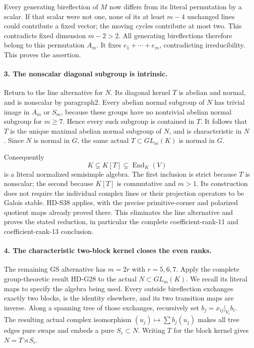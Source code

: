 Every generating bireflection of \(M\) now differs from its
literal permutation by a scalar. If that scalar were not one,
none of its at least \(m-4\) unchanged lines could contribute
a fixed vector; the moving cycles contribute at most two.
This contradicts fixed dimension \(m-2>2\). All generating
bireflections therefore belong to this permutation \(A_m\).
It fixes \(e_1+\cdots+e_m\), contradicting irreducibility.
This proves the assertion.

\paragraph{3. The nonscalar diagonal subgroup is intrinsic.}
Return to the line alternative for \(N\). Its diagonal
kernel \(T\) is abelian and normal, and is nonscalar by
paragraph2. Every abelian normal subgroup of \(N\) has
trivial image in \(A_m\) or \(S_m\), because these groups
have no nontrivial abelian normal subgroup for \(m\ge7\).
Hence every such subgroup is contained in \(T\). It follows
that \(T\) is the unique maximal abelian normal subgroup
of \(N\), and is characteristic in \(N\). Since \(N\)
is normal in \(G\), the same actual \(T\subset GL_m(K)\)
is normal in \(G\).

Consequently
\[
                  K\subsetneq K[T]\subsetneq
                        \operatorname{End}_K(V)             \tag{S40.9}
\]
is a literal normalized semisimple algebra. The first inclusion
is strict because \(T\) is nonscalar; the second because
\(K[T]\) is commutative and \(m>1\). Its construction
does not require the individual complex lines or their
projection operators to be Galois stable. HD-S38 applies,
with the precise primitive-corner and polarized quotient maps
already proved there. This eliminates the line alternative and
proves the stated reduction, in particular the complete
coefficient-rank-11 and coefficient-rank-13 conclusion.

\paragraph{4. The characteristic two-block kernel closes the even ranks.}
The remaining GS alternative has \(m=2r\) with
\(r=5,6,7\). Apply the complete group-theoretic result
HD-G28 to the actual \(N\subset GL_m(K)\).
We recall its literal maps to specify the algebra being used.
Every outside bireflection exchanges exactly two blocks, is
the identity elsewhere, and its two transition maps are inverse.
Along a spanning tree of those exchanges, recursively set
\(b_j=x_{ij}|_{V_i}b_i\). The resulting actual complex
isomorphism \((u_j)\mapsto\sum b_j(u_j)\) makes all tree
edges pure swaps and embeds a pure \(S_r\subset N\).
Writing \(T\) for the block kernel gives \(N=T\rtimes S_r\).

